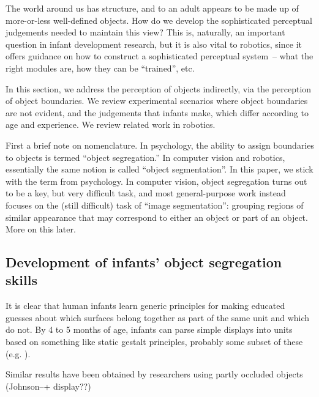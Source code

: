 
The world around us has structure, and to an adult appears to be made
up of more-or-less well-defined objects.  How do we develop the
sophisticated perceptual judgements needed to maintain this view?
This is, naturally, an important question in infant development research,
but it is also vital to robotics, since it offers guidance on how
to construct a sophisticated perceptual system~-- what the right
modules are, how they can be ``trained'', etc.

In this section, we address the perception of objects indirectly, via
the perception of object boundaries.  We review experimental scenarios
where object boundaries are not evident, and the judgements that
infants make, which differ according to age and experience.  We review
related work in robotics.  

First a brief note on nomenclature.
%
In psychology, the ability to assign boundaries to objects is termed
``object segregation.''  In computer vision and robotics, essentially
the same notion is called ``object segmentation''.  In this paper, we
stick with the term from psychology.  In computer vision, object
segregation turns out to be a key, but very difficult task, and most
general-purpose work instead focuses on the (still difficult) task of
``image segmentation'': grouping regions of similar appearance that
may correspond to either an object or part of an object.
%
More on this later.
%
%
%




\subsection{Development of infants' object segregation skills}

It is clear that human infants learn generic principles for making
educated guesses about which surfaces belong together as part of the
same unit and which do not.  By 4 to 5 months of age, infants can
parse simple displays into units based on something like static
gestalt principles, probably some subset of these (e.g. ).

Similar results have been obtained by researchers using partly
occluded objects (Johnson--+ display??)

